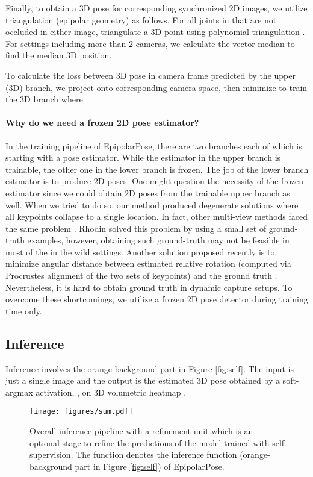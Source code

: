 \documentclass[10pt,twocolumn,letterpaper]{article}
\begin{document}
Finally, to obtain a 3D pose  for corresponding synchronized 2D images, we utilize triangulation (\ie epipolar geometry) as follows. For all joints in  that are not occluded in either image, triangulate a 3D point  using polynomial triangulation \cite{Hartley1997}. For settings including more than 2 cameras, we calculate the vector-median to find the median 3D position.

To calculate the loss between 3D pose in camera frame  predicted by the upper (3D) branch, we project  onto corresponding camera space, then minimize   to train the 3D branch where 



\paragraph{Why do we need a frozen 2D pose estimator?} In the training pipeline of EpipolarPose, there are two branches each of which is starting with a pose estimator. While the estimator in the upper branch is trainable,  the other one in the lower branch is frozen. The job of the lower branch estimator is to produce 2D poses. One might question the necessity of the frozen estimator since we could obtain 2D poses from the trainable upper branch as well. When we tried to do so, our method produced degenerate solutions where all keypoints collapse to a single location. In fact, other multi-view methods faced the same problem \cite{rhodin2018,suwajanakorn}.  Rhodin \etal \cite{rhodin2018} solved this problem by using a small set of ground-truth  examples, however, obtaining such  ground-truth may not be feasible in most of the in the wild settings. Another solution proposed recently \cite{suwajanakorn} is to minimize angular distance between estimated relative rotation  (computed via Procrustes alignment of the two sets of keypoints) and the ground truth . Nevertheless, it is hard to obtain ground truth  in dynamic capture setups. To overcome these shortcomings, we utilize a frozen 2D pose detector during training time only.
\subsection{Inference}

Inference involves the orange-background part in Figure \ref{fig:self}. The input is just a single image and the output is the estimated 3D pose  obtained by a soft-argmax activation, , on 3D volumetric heatmap .

\begin{figure}
\centering
\texttt{[image: figures/sum.pdf]}
\caption{Overall inference pipeline with a refinement unit which is an optional stage to refine the predictions of the model trained with self supervision. The  function denotes the inference function (orange-background part in Figure \ref{fig:self}) of EpipolarPose. }
\label{fig:sum}
\end{figure}
\end{document}
